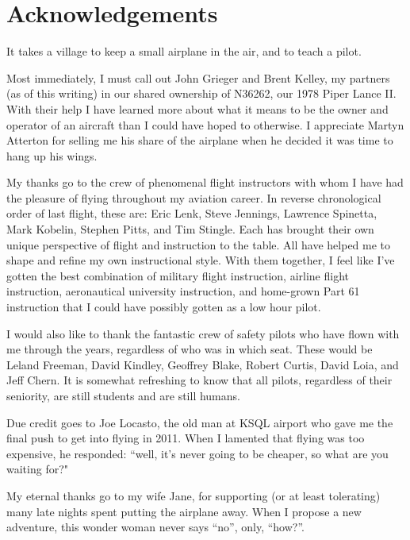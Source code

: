 \section*{Acknowledgements}

It takes a village to keep a small airplane in the air, and to teach a pilot.

Most immediately, I must call out John Grieger and Brent Kelley, my partners (as of this writing) in our shared ownership of N36262, our 1978 Piper Lance II. With their help I have learned more about what it means to be the owner and operator of an aircraft than I could have hoped to otherwise. I appreciate Martyn Atterton for selling me his share of the airplane when he decided it was time to hang up his wings.

My thanks go to the crew of phenomenal flight instructors with whom I have had the pleasure of flying throughout my aviation career. In reverse chronological order of last flight, these are: Eric Lenk, Steve Jennings, Lawrence Spinetta, Mark Kobelin, Stephen Pitts, and Tim Stingle. Each has brought their own unique perspective of flight and instruction to the table. All have helped me to shape and refine my own instructional style. With them together, I feel like I've gotten the best combination of military flight instruction, airline flight instruction, aeronautical university instruction, and home-grown Part 61 instruction that I could have possibly gotten as a low hour pilot.

I would also like to thank the fantastic crew of safety pilots who have flown with me through the years, regardless of who was in which seat. These would be Leland Freeman, David Kindley, Geoffrey Blake, Robert Curtis, David Loia, and Jeff Chern. It is somewhat refreshing to know that all pilots, regardless of their seniority, are still students and are still humans.

Due credit goes to Joe Locasto, the old man at KSQL airport who gave me the final push to get into flying in 2011. When I lamented that flying was too expensive, he responded: ``well, it's never going to be cheaper, so what are you waiting for?"

My eternal thanks go to my wife Jane, for supporting (or at least tolerating) many late nights spent putting the airplane away. When I propose a new adventure, this wonder woman never says ``no'', only, ``how?''.


